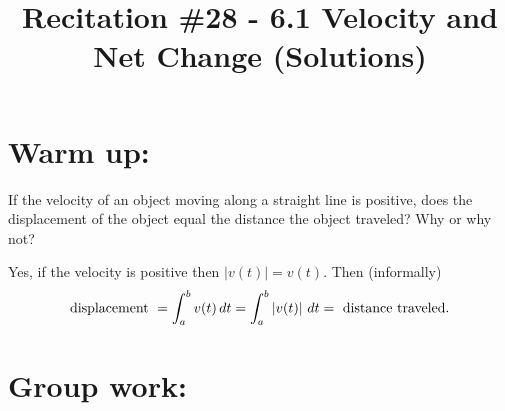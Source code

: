 \documentclass[nooutcomes]{ximera}
\title{Recitation \#28 - 6.1 Velocity and Net Change (Solutions)}
\begin{document}
\begin{abstract}		\end{abstract}
\maketitle

\section*{Warm up:} 
If the velocity of an object moving along a straight line is positive, does the displacement of the object equal the distance the object traveled?  Why or why not?
		\begin{freeResponse}
		Yes, if the velocity is positive then $\left| v(t) \right|=v(t)$.  Then (informally)
			\begin{equation*}
			\text{displacement } = \int_a^b v(t) \,d t = \int_a^b \left| v(t) \right| \,d t = \text{ distance traveled}.
			\end{equation*}
		\end{freeResponse}	
		
		
		

	
	
	
	
	

\section*{Group work:}
\end{document}
